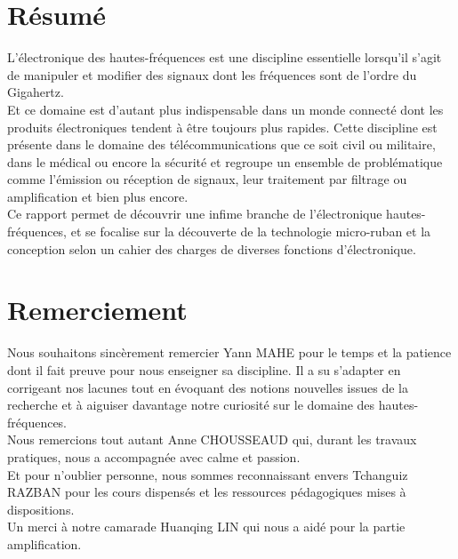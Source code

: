 \documentclass[french]{article}
\begin{document}
\newpage

\tableofcontents
\newpage
\listoffigures
\listoftables
\newpage


\vspace*{4cm}
\section*{Résumé}
L'électronique des hautes-fréquences est une discipline essentielle lorsqu'il s'agit de manipuler et modifier des signaux dont les fréquences sont de l'ordre du Gigahertz.\\
Et ce domaine est d'autant plus indispensable dans un monde connecté dont les produits électroniques tendent à être toujours plus rapides. Cette discipline est présente dans le domaine des télécommunications que ce soit civil ou militaire, dans le médical ou encore la sécurité et regroupe un ensemble de problématique comme l'émission ou réception de signaux, leur traitement par filtrage ou amplification et bien plus encore.\\
Ce rapport permet de découvrir une infime branche de l'électronique hautes-fréquences, et se focalise sur la découverte de la technologie micro-ruban et la conception selon un cahier des charges de diverses fonctions d'électronique.

\vspace{1cm}

\section*{Remerciement}
Nous souhaitons sincèrement remercier Yann MAHE pour le temps et la patience dont il fait preuve pour nous enseigner sa discipline. Il a su s'adapter en corrigeant nos lacunes tout en évoquant des notions nouvelles issues de la recherche et à aiguiser davantage notre curiosité sur le domaine des hautes-fréquences.\\
Nous remercions tout autant Anne CHOUSSEAUD qui, durant les travaux pratiques, nous a accompagnée avec calme et passion.\\
Et pour n'oublier personne, nous sommes reconnaissant envers Tchanguiz RAZBAN pour les cours dispensés et les ressources pédagogiques mises à dispositions.\\
Un merci à notre camarade Huanqing LIN qui nous a aidé pour la partie amplification.

\newpage
\pagestyle{plain} %
\end{document}
